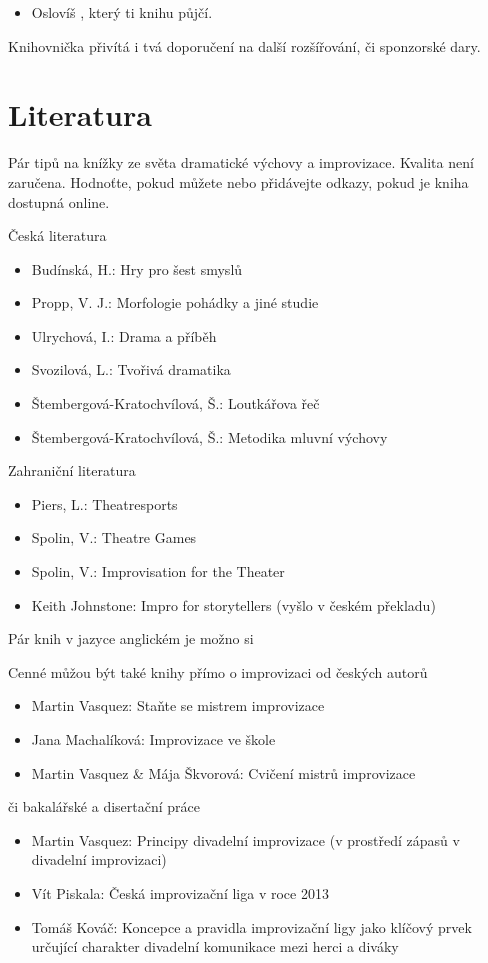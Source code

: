 \documentclass[main.tex]{subfiles}
\begin{document}
\begin{itemize}
\item  Oslovíš , který ti knihu půjčí.
\end{itemize}
 
Knihovnička přivítá i tvá doporučení na další rozšířování, či sponzorské dary. 
\needspace{5cm} \section{Literatura} \label{literatura} Pár tipů na knížky ze světa dramatické výchovy a improvizace. Kvalita není zaručena. Hodnoťte, pokud můžete nebo přidávejte odkazy, pokud je kniha dostupná online. 
 
Česká literatura 
\begin{itemize}
\item  Budínská, H.: Hry pro šest smyslů
\item  Propp, V. J.: Morfologie pohádky a jiné studie
\item  Ulrychová, I.: Drama a příběh
\item  Svozilová, L.: Tvořivá dramatika
\item  Štembergová-Kratochvílová, Š.: Loutkářova řeč
\item  Štembergová-Kratochvílová, Š.: Metodika mluvní výchovy
\end{itemize}
 
 
Zahraniční literatura  
 
\begin{itemize}
\item  Piers, L.: Theatresports
\item  Spolin, V.: Theatre Games
\item  Spolin, V.: Improvisation for the Theater
\item  Keith Johnstone: Impro for storytellers  (vyšlo v českém překladu)
\end{itemize}
 
Pár knih v jazyce anglickém je možno si  
 
Cenné můžou být také knihy přímo o improvizaci od českých autorů 
\begin{itemize}
\item  Martin Vasquez: Staňte se mistrem improvizace
\item  Jana Machalíková: Improvizace ve škole
\item  Martin Vasquez & Mája Škvorová: Cvičení mistrů improvizace
\end{itemize}
 
či bakalářské a disertační práce 
\begin{itemize}
\item  Martin Vasquez: Principy  divadelní  improvizace  (v  prostředí  zápasů  v  divadelní improvizaci)
\item  Vít Piskala: Česká improvizační liga v roce 2013
\item  Tomáš Kováč: Koncepce a pravidla improvizační ligy jako klíčový prvek určující charakter divadelní komunikace mezi herci a diváky
\end{itemize}
 
 
 
\end{document}
